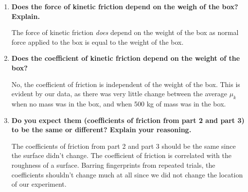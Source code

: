 \begin{enumerate}
\item \textbf{Does the force of kinetic friction depend on the weigh of the box? Explain.}

	The force of kinetic friction \textit{does} depend on the weight of the box as normal force applied to the box is equal to the weight of the box. 

\item \textbf{Does the coefficient of kinetic friction depend on the weight of the box?}

No, the coefficient of friction is independent of the weight of the box. This is evident by our data, as there was very little change between the average $\mu_k$ when no mass was in the box, and when 500 kg of mass was in the box.

\item \textbf{Do you expect them (coefficients of friction from part 2 and part 3) to be the same or different? Explain your reasoning.}

	The coefficients of friction from part 2 and part 3 should be the same since the surface didn't change. The coefficient of friction is correlated with the roughness of a surface. Barring fingerprints from repeated trials, the coefficients shouldn't change much at all since we did not change the location of our experiment. 

\end{enumerate}


